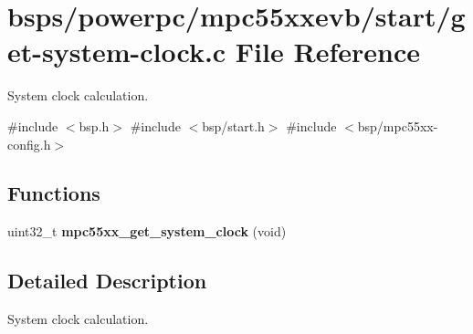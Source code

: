 \hypertarget{get-system-clock_8c}{}\section{bsps/powerpc/mpc55xxevb/start/get-\/system-\/clock.c File Reference}
\label{get-system-clock_8c}


System clock calculation.  


{\ttfamily \#include $<$bsp.\+h$>$}\newline
{\ttfamily \#include $<$bsp/start.\+h$>$}\newline
{\ttfamily \#include $<$bsp/mpc55xx-\/config.\+h$>$}\newline
\subsection*{Functions}
\begin{DoxyCompactItemize}
\item 
\mbox{\label{get-system-clock_8c_adafd9c30091cdf0d45ddc859bb1d2822}} 
uint32\+\_\+t {\bfseries mpc55xx\+\_\+get\+\_\+system\+\_\+clock} (void)
\end{DoxyCompactItemize}


\subsection{Detailed Description}
System clock calculation. 

